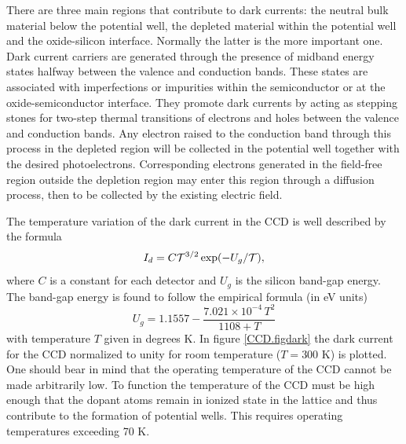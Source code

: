 There are three main regions that contribute to dark currents: the
neutral bulk material below the potential well, the depleted material
within the potential well and the oxide-silicon interface. Normally
the latter is the more important one. Dark current carriers are
generated through the presence of midband energy states halfway
between the valence and conduction bands. These states are associated
with imperfections or impurities within the semiconductor or at the
oxide-semiconductor interface. They promote dark currents by acting as
stepping stones for two-step thermal transitions of electrons and
holes between the valence and conduction bands. Any electron raised to
the conduction band through this process in the depleted region will
be collected in the potential well together with the desired
photoelectrons. Corresponding electrons generated in the field-free
region outside the depletion region may enter this region through a
diffusion process, then to be collected by the existing electric field.
 
The temperature variation of the dark current in the CCD is well
described by the formula
\begin{equation}
  I_d = C {\cal T}^{3/2} \exp(-U_g/{\cal T}),
\end{equation}
where $C$ is a constant for each detector and $U_g$ is the silicon
band-gap energy. The band-gap energy is found to follow the empirical
formula (in eV units)
\begin{equation}
  U_g = 1.1557 - \frac{7.021\times 10^{-4}\, T^2}{1108+T}
\end{equation} 
with temperature $T$ given in degrees K. In figure \ref{CCD.figdark}
the dark current for the CCD normalized to unity for room temperature
($T = 300$ K) is plotted.  One should bear in mind that the operating
temperature of the CCD cannot be made arbitrarily low. To function the
temperature of the CCD must be high enough that the dopant atoms
remain in ionized state in the lattice and thus contribute to the
formation of potential wells. This requires operating temperatures
exceeding 70 K.

